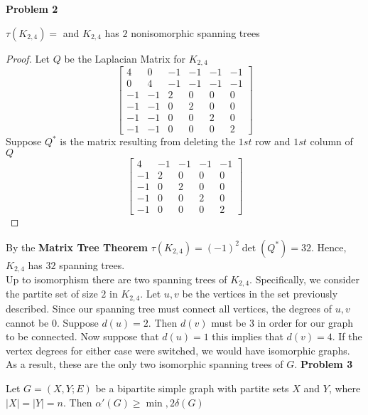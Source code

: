 \documentclass{article}
\newenvironment{claim}[2][Claim]{\begin{trivlist}
		\item[\hskip \labelsep {\bfseries #1}\hskip \labelsep {\bfseries #2}]}{\end{trivlist}}
\begin{document}
\noindent \textbf{Problem 2}
\begin{claim}{}
	$\tau(K_{2,4}) = $ and $K_{2,4}$ has $2$ nonisomorphic spanning trees
\end{claim}
\begin{proof}
Let $Q$ be the Laplacian Matrix for $K_{2,4}$ 
\[
\begin{bmatrix}
	4  &  0  & -1 & -1 & -1 & -1 \\
	0  &  4  & -1 & -1 & -1 & -1 \\
	-1 & -1  &  2 &  0 &  0 &  0 \\
	-1 & -1  &  0 &  2 &  0 &  0 \\
	-1 & -1  &  0 &  0 &  2 &  0 \\
	-1 & -1  &  0 &  0 &  0 &  2 
\end{bmatrix}
\]
Suppose $Q^*$ is the matrix resulting from deleting the $1st$ row and $1st$ column of $Q$
\[
\begin{bmatrix}
 4  & -1 & -1 & -1 & -1 \\
-1  &  2 &  0 &  0 &  0 \\
-1  &  0 &  2 &  0 &  0 \\
-1  &  0 &  0 &  2 &  0 \\
-1  &  0 &  0 &  0 &  2 
\end{bmatrix}
\]
\end{proof}
By the \textbf{Matrix Tree Theorem} $\tau(K_{2,4}) = (-1)^2 \det(Q^*) = 32$. Hence, $K_{2,4}$ has $32$ spanning trees. \\
Up to isomorphism there are two spanning trees of $K_{2,4}$. Specifically, we consider the partite set of size $2$ in $K_{2,4}$. Let $u,v$ be the vertices in the set previously described. Since our spanning tree must connect all vertices, the degrees of $u,v$ cannot be $0$. Suppose $d(u) = 2$. Then $d(v)$ must be $3$ in order for our graph to be connected. Now suppose that $d(u) = 1$ this implies that $d(v) = 4$. If the vertex degrees for either case were switched, we would have isomorphic graphs. As a result, these are the only two isomorphic spanning trees of $G$. 
\newpage
\noindent \textbf{Problem 3}
\begin{claim}{}
Let $G = (X,Y ; E)$ be a bipartite simple graph with partite sets $X$ and $Y$, where $|X| = |Y| = n$. Then $\alpha'(G) \geq \min{, 2 \delta(G)}$ 
\end{claim}
\end{document}
